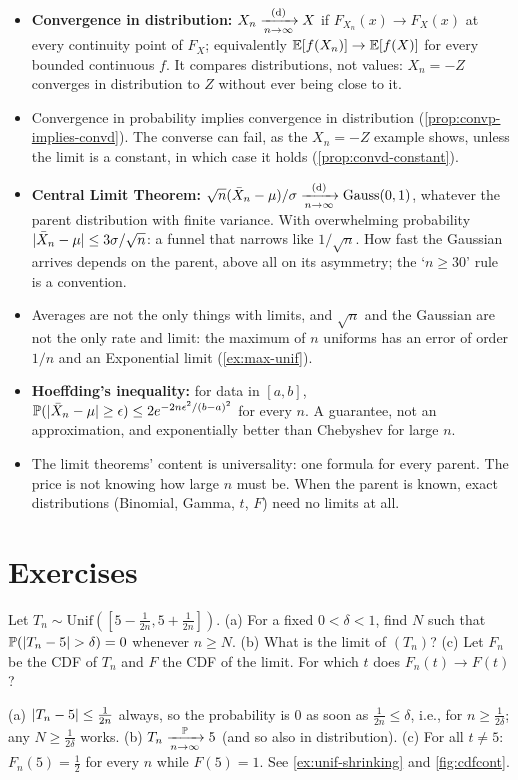 \begin{itemize}[nosep]
\item \textbf{Convergence in distribution:} $X_n \xrightarrow [n \to \infty ]{\text{(d)}} X$ if $F_{X_n}(x) \to F_X(x)$ at every continuity point of $F_X$; equivalently $\operatorname*{\mathbb{E}}[f(X_n)] \to \operatorname*{\mathbb{E}}[f(X)]$ for every bounded continuous $f$. It compares distributions, not values: $X_n = -Z$ converges in distribution to $Z$ without ever being close to it.
\item Convergence in probability implies convergence in distribution (\cref{prop:convp-implies-convd}). The converse can fail, as the $X_n = -Z$ example shows, unless the limit is a constant, in which case it holds (\cref{prop:convd-constant}).
\item \textbf{Central Limit Theorem:} $\sqrt{n}(\bar{X}_n - \mu)/\sigma \xrightarrow [n \to \infty ]{\text{(d)}} \text{Gauss}(0,1)$, whatever the parent distribution with finite variance. With overwhelming probability $\lvert\bar{X}_n - \mu\rvert \leq 3\sigma/\sqrt{n}$: a funnel that narrows like $1/\sqrt{n}$. How fast the Gaussian arrives depends on the parent, above all on its asymmetry; the `$n \geq 30$' rule is a convention.
\item Averages are not the only things with limits, and $\sqrt{n}$ and the Gaussian are not the only rate and limit: the maximum of $n$ uniforms has an error of order $1/n$ and an Exponential limit (\cref{ex:max-unif}).
\item \textbf{Hoeffding's inequality:} for data in $[a,b]$, $\mathbb{P}(\lvert\bar{X}_n - \mu\rvert \geq \epsilon) \leq 2 e^{-2n\epsilon^2/(b-a)^2}$ for every $n$. A guarantee, not an approximation, and exponentially better than Chebyshev for large $n$.
\item The limit theorems' content is universality: one formula for every parent. The price is not knowing how large $n$ must be. When the parent is known, exact distributions (Binomial, Gamma, $t$, $F$) need no limits at all.
\end{itemize}

\section{Exercises}
\label{sec:clt-exercises}

\begin{exercise}
Let $T_n \sim \text{Unif}([5 - \frac{1}{2n}, 5 + \frac{1}{2n}])$. (a) For a fixed $0 < \delta < 1$, find $N$ such that $\mathbb{P}(\lvert T_n - 5\rvert > \delta) = 0$ whenever $n \geq N$. (b) What is the limit of $(T_n)$? (c) Let $F_n$ be the CDF of $T_n$ and $F$ the CDF of the limit. For which $t$ does $F_n(t) \to F(t)$?
\end{exercise}
\begin{solution}
(a) $\lvert T_n - 5\rvert \leq \frac{1}{2n}$ always, so the probability is $0$ as soon as $\frac{1}{2n} \leq \delta$, i.e., for $n \geq \frac{1}{2\delta}$; any $N \geq \frac{1}{2\delta}$ works. (b) $T_n \xrightarrow [n \to \infty ]{\mathbb{P}} 5$ (and so also in distribution). (c) For all $t \neq 5$: $F_n(5) = \frac12$ for every $n$ while $F(5) = 1$. See \cref{ex:unif-shrinking} and \cref{fig:cdfcont}.
\end{solution}

